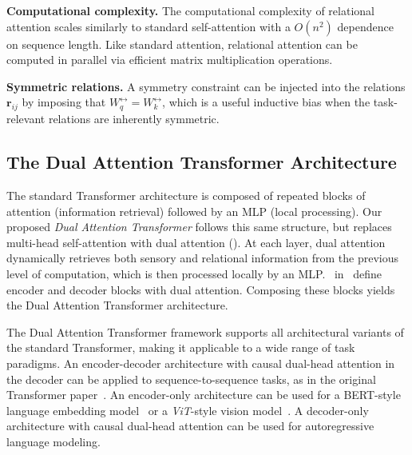 \textbf{Computational complexity.} The computational complexity of relational attention scales similarly to standard self-attention with a $O(n^2)$ dependence on sequence length. Like standard attention, relational attention can be computed in parallel via efficient matrix multiplication operations.

\textbf{Symmetric relations.} A symmetry constraint can be injected into the relations $\bm{r}_{ij}$ by imposing that $W_{q}^{\rel} = W_k^{\rel}$, which is a useful inductive bias when the task-relevant relations are inherently symmetric.

\subsection{The Dual Attention Transformer Architecture}

The standard Transformer architecture is composed of repeated blocks of attention (information retrieval) followed by an MLP (local processing). Our proposed \textit{Dual Attention Transformer} follows this same structure, but replaces multi-head self-attention with dual attention ().  At each layer, dual attention dynamically retrieves both sensory and relational information from the previous level of computation, which is then processed locally by an MLP.~ in~ define encoder and decoder blocks with dual attention. Composing these blocks yields the Dual Attention Transformer architecture.

The Dual Attention Transformer framework supports all architectural variants of the standard Transformer, making it applicable to a wide range of task paradigms. An encoder-decoder architecture with causal dual-head attention in the decoder can be applied to sequence-to-sequence tasks, as in the original Transformer paper~\citep{vaswani2017attention}. An encoder-only architecture can be used for a BERT-style language embedding model~\citep{devlinBERTPretrainingDeep2019} or a \textit{ViT}-style vision model~\citep{dosovitskiyImageWorth16x162020}. A decoder-only architecture with causal dual-head attention can be used for autoregressive language modeling.
